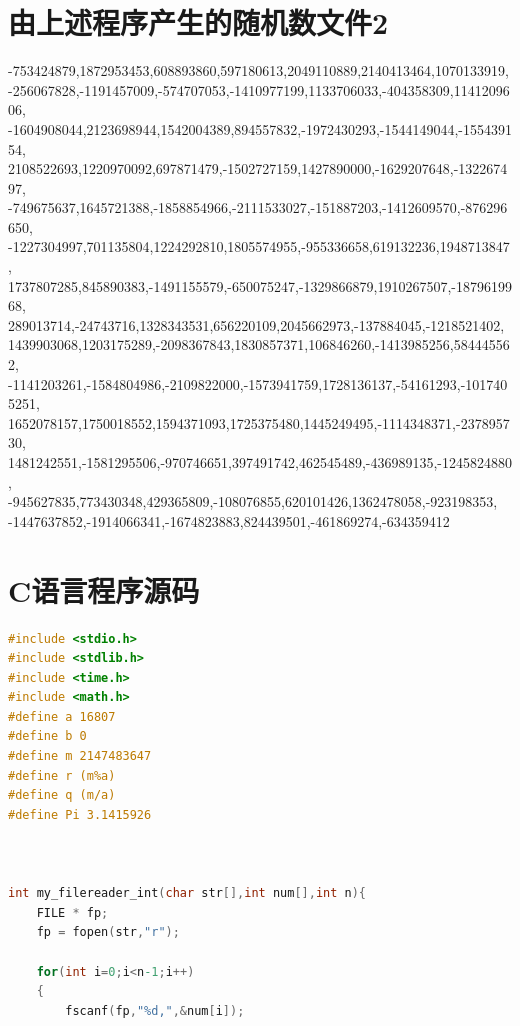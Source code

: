 \documentclass[a4paper,11pt]{article}
\begin{document}
\begin{appendices}
\section{由上述程序产生的随机数文件2}
\label{972}
-753424879,1872953453,608893860,597180613,2049110889,2140413464,1070133919,\\
-256067828,-1191457009,-574707053,-1410977199,1133706033,-404358309,1141209606,\\
-1604908044,2123698944,1542004389,894557832,-1972430293,-1544149044,-155439154,\\
2108522693,1220970092,697871479,-1502727159,1427890000,-1629207648,-132267497,\\
-749675637,1645721388,-1858854966,-2111533027,-151887203,-1412609570,-876296650,\\
-1227304997,701135804,1224292810,1805574955,-955336658,619132236,1948713847,\\
1737807285,845890383,-1491155579,-650075247,-1329866879,1910267507,-1879619968,\\
289013714,-24743716,1328343531,656220109,2045662973,-137884045,-1218521402,\\
1439903068,1203175289,-2098367843,1830857371,106846260,-1413985256,584445562,\\
-1141203261,-1584804986,-2109822000,-1573941759,1728136137,-54161293,-1017405251,\\
1652078157,1750018552,1594371093,1725375480,1445249495,-1114348371,-237895730,\\
1481242551,-1581295506,-970746651,397491742,462545489,-436989135,-1245824880,\\
-945627835,773430348,429365809,-108076855,620101426,1362478058,-923198353,\\
-1447637852,-1914066341,-1674823883,824439501,-461869274,-634359412
\section{C语言程序源码}

\begin{lstlisting}[language = C]
#include <stdio.h>
#include <stdlib.h>
#include <time.h>
#include <math.h>
#define a 16807
#define b 0
#define m 2147483647
#define r (m%a)
#define q (m/a)
#define Pi 3.1415926



int my_filereader_int(char str[],int num[],int n){
    FILE * fp;
    fp = fopen(str,"r");
    
    for(int i=0;i<n-1;i++)
    {
        fscanf(fp,"%d,",&num[i]);
        

\end{lstlisting}
\end{appendices}
\end{document}
